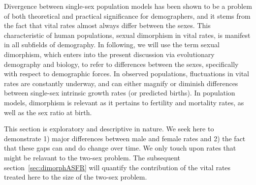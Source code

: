  \FloatBarrier
Divergence between single-sex population models has been shown to be a problem
of both theoretical and practical significance for demographers, and it stems from
the fact that vital rates almost always differ between the sexes.
This characteristic of human populations, sexual dimorphism in vital rates,
is manifest in all subfields of demography. In following, we will use the term
sexual dimorphism, which enters into the present discussion via evolutionary
demography and biology, to refer to differences between the
sexes, specifically with respect to demographic forces. In observed populations,
fluctuations in vital rates are constantly underway, and can either magnify or 
diminish differences between single-sex intrinsic growth rates (or predicted births). 
In population models, dimorphism is relevant as it pertains to fertility and mortality 
rates, as well as the sex ratio at birth.

This section is exploratory and descriptive in nature. We seek here to
demonstrate 1) major differences between male and female rates and 2) the fact
that these gaps can and do change over time. We only touch upon rates that might
be relavant to the two-sex problem. The subsequent section~\ref{sec:dimorphASFR}
will quantify the contribution of the vital rates treated here to the size of the two-sex
problem.
